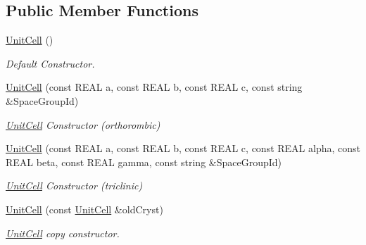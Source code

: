 \subsection*{Public Member Functions}
\begin{DoxyCompactItemize}
\item 
\mbox{\label{class_obj_cryst_1_1_unit_cell_a51e806f8efcbc6f9f01212ed6ba159c9}} 
\mbox{\hyperlink{class_obj_cryst_1_1_unit_cell_a51e806f8efcbc6f9f01212ed6ba159c9}{Unit\+Cell}} ()
\begin{DoxyCompactList}\small\item\em Default Constructor. \end{DoxyCompactList}\item 
\mbox{\hyperlink{class_obj_cryst_1_1_unit_cell_ade3fec2bf55893d193be14001bd74f72}{Unit\+Cell}} (const R\+E\+AL a, const R\+E\+AL b, const R\+E\+AL c, const string \&Space\+Group\+Id)
\begin{DoxyCompactList}\small\item\em \mbox{\hyperlink{class_obj_cryst_1_1_unit_cell}{Unit\+Cell}} Constructor (orthorombic) \end{DoxyCompactList}\item 
\mbox{\hyperlink{class_obj_cryst_1_1_unit_cell_a9bb20fbe0be4e8296d400eed4dc3ae3d}{Unit\+Cell}} (const R\+E\+AL a, const R\+E\+AL b, const R\+E\+AL c, const R\+E\+AL alpha, const R\+E\+AL beta, const R\+E\+AL gamma, const string \&Space\+Group\+Id)
\begin{DoxyCompactList}\small\item\em \mbox{\hyperlink{class_obj_cryst_1_1_unit_cell}{Unit\+Cell}} Constructor (triclinic) \end{DoxyCompactList}\item 
\mbox{\label{class_obj_cryst_1_1_unit_cell_a891da67e4f9c2aab210b8b7b0b1986cd}} 
\mbox{\hyperlink{class_obj_cryst_1_1_unit_cell_a891da67e4f9c2aab210b8b7b0b1986cd}{Unit\+Cell}} (const \mbox{\hyperlink{class_obj_cryst_1_1_unit_cell}{Unit\+Cell}} \&old\+Cryst)
\begin{DoxyCompactList}\small\item\em \mbox{\hyperlink{class_obj_cryst_1_1_unit_cell}{Unit\+Cell}} copy constructor. \end{DoxyCompactList}\item 
\mbox{\label{class_obj_cryst_1_1_unit_cell_aab63f4f8527568531f015721a48b6da5}} 

\end{DoxyCompactItemize}
